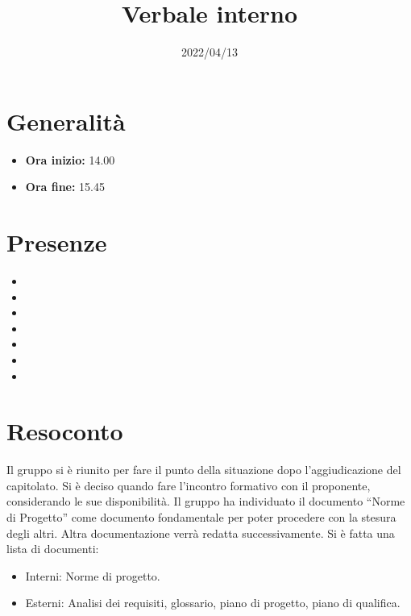 \documentclass{classes/base}
\title{Verbale interno}
\date{2022/04/13}
\author{\angela}
\renewcommand{\maketitle}{
    
}
\begin{document}
    \maketitle

    \section*{Generalità}
    \begin{itemize}
        \item \textbf{Ora inizio:} 14.00
        \item \textbf{Ora fine:} 15.45
    \end{itemize}

    \section*{Presenze}
    \begin{itemize}
        \item \tommaso
        \item \marcob
        \item \marcov
        \item \angela
        \item \giulio
        \item \ruth
        \item \matteo
    \end{itemize}

    \section*{Resoconto}
    Il gruppo si è riunito per fare il punto della situazione dopo l’aggiudicazione del capitolato.
    Si è deciso quando fare l’incontro formativo con il proponente, considerando le sue disponibilità.
    Il gruppo ha individuato il documento “Norme di Progetto” come documento fondamentale per poter procedere con la stesura degli altri.
    Altra documentazione verrà redatta successivamente. Si è fatta una lista di documenti:
    \begin{itemize}
        \item Interni: Norme di progetto.
        \item Esterni: Analisi dei requisiti, glossario, piano di progetto, piano di qualifica.
    \end{itemize}
\end{document}
